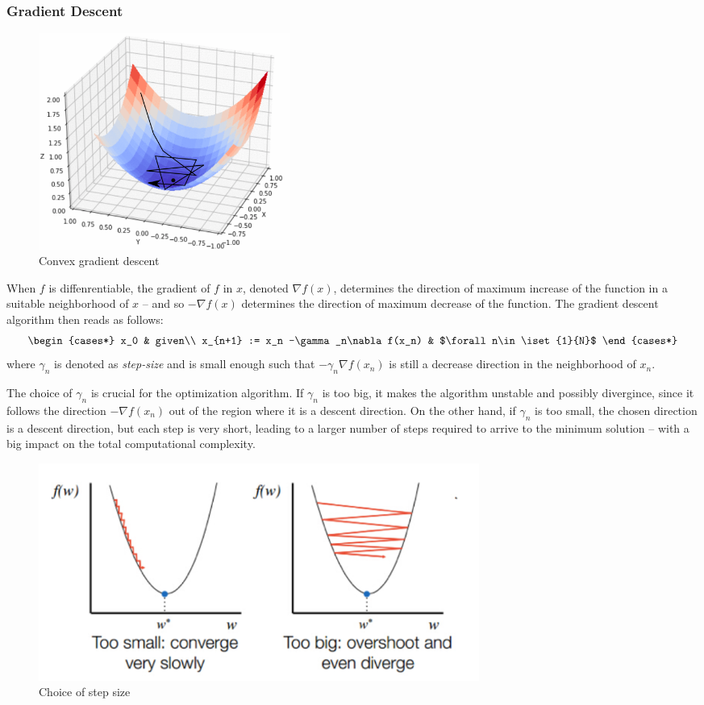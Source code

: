 \documentclass{../cs-classes/cs-classes}
\begin{document}
\subsubsection{Gradient Descent}
\begin{figure}
    \captionsetup{justification=centering}
    \includegraphics[width=0.4\textwidth]{images/gradient-descent-2.png}
    \caption{Convex gradient descent}
\end{figure}
When $f$ is diffenrentiable, the gradient of $f$ in $x$, denoted $\nabla f(x)$, determines the direction of maximum increase of the function in a suitable neighborhood of $x$ -- and so $-\nabla f(x)$ determines the direction of maximum decrease of the function. The gradient descent algorithm then reads as follows:
\begin{equation*}
    \begin{cases*}
        x_0 & given\\
        x_{n+1} := x_n -\gamma_n\nabla f(x_n) & $\forall n\in\iset{1}{N}$
    \end{cases*}
\end{equation*}
where $\gamma_n$ is denoted as \emph{step-size} and is small enough such that $-\gamma_n\nabla f(x_n)$ is still a decrease direction in the neighborhood of $x_n$.

The choice of $\gamma_n$ is crucial for the optimization algorithm. If $\gamma_n$ is too big, it makes the algorithm unstable and possibly divergince, since it follows the direction $-\nabla f(x_n)$ out of the region where it is a descent direction. On the other hand, if $\gamma_n$ is too small, the chosen direction is a descent direction, but each step is very short, leading to a larger number of steps required to arrive to the minimum solution -- with a big impact on the total computational complexity.

\begin{figure}[H]
    \centering
    \includegraphics[width=0.7\textwidth]{images/gd-step-size.png}
    \caption{Choice of step size}
\end{figure}
\end{document}
